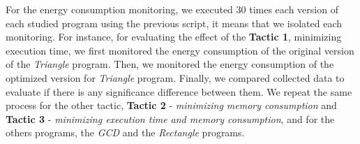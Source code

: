 
\vspace{0.5em}


\vspace{0.5em}
For the energy consumption monitoring, we executed 30 times each version of each studied program using the previous script, it means that we isolated each monitoring. For instance, for evaluating the effect of the \textbf{Tactic 1}, \ie minimizing execution time, we first monitored the energy consumption of the original version of the \textit{Triangle} program. Then, we monitored the energy consumption of the optimized version for \textit{Triangle} program.
Finally, we compared collected data to evaluate if there is any significance difference between them.
We repeat the same process for the other tactic, \ie \textbf{Tactic 2} - \textit{minimizing memory consumption} and \textbf{Tactic 3} - \textit{minimizing execution time and memory consumption}, and for the others programs, \ie the \textit{GCD} and the \textit{Rectangle} programs.

